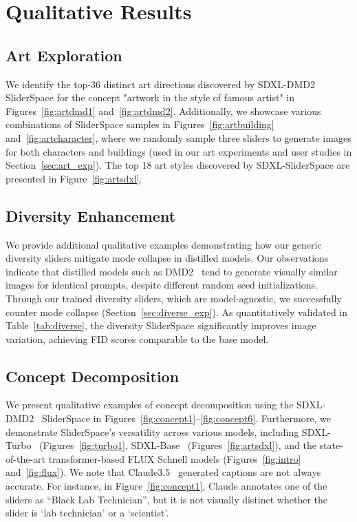 \section{Qualitative Results}
\subsection{Art Exploration}
We identify the top-36 distinct art directions discovered by SDXL-DMD2 SliderSpace for the concept "artwork in the style of famous artist" in Figures~\ref{fig:artdmd1} and~\ref{fig:artdmd2}. Additionally, we showcase various combinations of SliderSpace samples in Figures~\ref{fig:artbuilding} and~\ref{fig:artcharacter}, where we randomly sample three sliders to generate images for both characters and buildings (used in our art experiments and user studies in Section~\ref{sec:art_exp}). The top 18 art styles discovered by SDXL-SliderSpace are presented in Figure~\ref{fig:artsdxl}.



\subsection{Diversity Enhancement}
We provide additional qualitative examples demonstrating how our generic diversity sliders mitigate mode collapse in distilled models. Our observations indicate that distilled models such as DMD2~\cite{dmd} tend to generate visually similar images for identical prompts, despite different random seed initializations. Through our trained diversity sliders, which are model-agnostic, we successfully counter mode collapse (Section~\ref{sec:diverse_exp}). As quantitatively validated in Table~\ref{tab:diverse}, the diversity SliderSpace significantly improves image variation, achieving FID scores comparable to the base model.

\subsection{Concept Decomposition}
We present qualitative examples of concept decomposition using the SDXL-DMD2~\cite{dmd} SliderSpace in Figures~\ref{fig:concept1}--\ref{fig:concept6}. Furthermore, we demonstrate SliderSpace's versatility across various models, including SDXL-Turbo~\cite{turbo} (Figures~\ref{fig:turbo1}, SDXL-Base~\cite{podell2023sdxl} (Figures~\ref{fig:artsdxl}), and the state-of-the-art transformer-based FLUX Schnell models (Figures~\ref{fig:intro} and~\ref{fig:flux}). We note that Claude3.5~\cite{claude} generated captions are not always accurate. For instance, in Figure~\ref{fig:concept1}, Claude annotates one of the sliders as ``Black Lab Technician'', but it is not visually distinct whether the slider is `lab technician' or a `scientist'.

